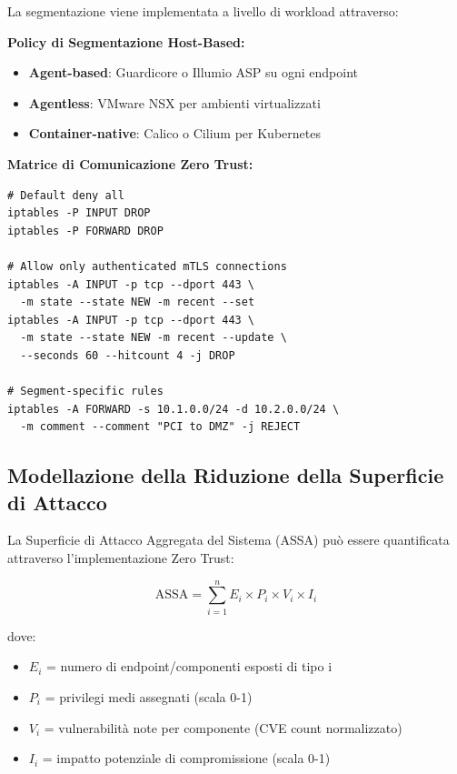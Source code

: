 La segmentazione viene implementata a livello di workload attraverso:

\textbf{Policy di Segmentazione Host-Based:}
\begin{itemize}
    \item \textbf{Agent-based}: Guardicore o Illumio ASP su ogni endpoint
    \item \textbf{Agentless}: VMware NSX per ambienti virtualizzati
    \item \textbf{Container-native}: Calico o Cilium per Kubernetes
\end{itemize}

\textbf{Matrice di Comunicazione Zero Trust:}
\begin{lstlisting}[caption={Regole iptables per micro-segmentazione},label={lst:iptables}]
# Default deny all
iptables -P INPUT DROP
iptables -P FORWARD DROP

# Allow only authenticated mTLS connections
iptables -A INPUT -p tcp --dport 443 \
  -m state --state NEW -m recent --set
iptables -A INPUT -p tcp --dport 443 \
  -m state --state NEW -m recent --update \
  --seconds 60 --hitcount 4 -j DROP

# Segment-specific rules
iptables -A FORWARD -s 10.1.0.0/24 -d 10.2.0.0/24 \
  -m comment --comment "PCI to DMZ" -j REJECT
\end{lstlisting}

\subsection{\texorpdfstring{\textbf{Modellazione della Riduzione della Superficie di Attacco}}{3.5.2 - Modellazione della Riduzione della Superficie di Attacco}}

La Superficie di Attacco Aggregata del Sistema (ASSA) può essere quantificata attraverso l'implementazione Zero Trust:

\begin{equation}
\text{ASSA} = \sum_{i=1}^{n} E_i \times P_i \times V_i \times I_i
\end{equation}

dove:
\begin{itemize}
    \item $E_i$ = numero di endpoint/componenti esposti di tipo i
    \item $P_i$ = privilegi medi assegnati (scala 0-1)
    \item $V_i$ = vulnerabilità note per componente (CVE count normalizzato)
    \item $I_i$ = impatto potenziale di compromissione (scala 0-1)
\end{itemize}


